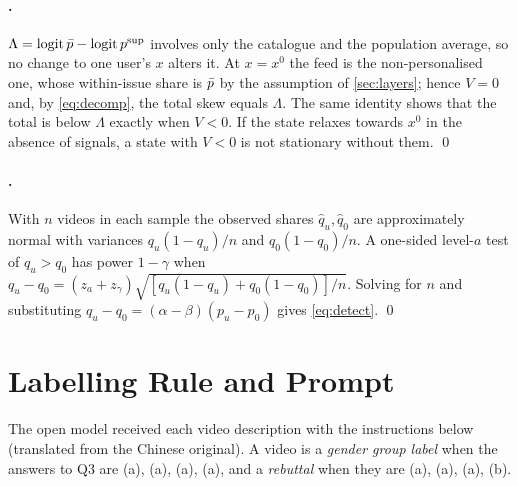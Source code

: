\paragraph{.} $\Lambda=\operatorname{logit}\bar p-\operatorname{logit}p^{\mathrm{sup}}$ involves only the catalogue and the population average, so no change to one user's $x$ alters it. At $x=x^0$ the feed is the non-personalised one, whose within-issue share is $\bar p$ by the assumption of \cref{sec:layers}; hence $V=0$ and, by \cref{eq:decomp}, the total skew equals $\Lambda$. The same identity shows that the total is below $\Lambda$ exactly when $V<0$. If the state relaxes towards $x^0$ in the absence of signals, a state with $V<0$ is not stationary without them. \qed

\paragraph{.} With $n$ videos in each sample the observed shares $\hat q_u,\hat q_0$ are approximately normal with variances $q_u(1-q_u)/n$ and $q_0(1-q_0)/n$. A one-sided level-$a$ test of $q_u>q_0$ has power $1-\gamma$ when $q_u-q_0=(z_a+z_\gamma)\sqrt{[q_u(1-q_u)+q_0(1-q_0)]/n}$. Solving for $n$ and substituting $q_u-q_0=(\alpha-\beta)(p_u-p_0)$ gives \cref{eq:detect}. \qed

\section{Labelling Rule and Prompt}
\label{app:prompt}

The open model received each video description with the instructions below (translated from the Chinese original). A video is a \emph{gender group label} when the answers to Q3 are (a), (a), (a), (a), and a \emph{rebuttal} when they are (a), (a), (a), (b).

